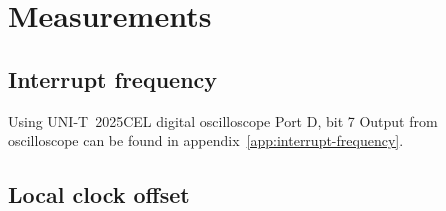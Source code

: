 
\chapter{Measurements}

\section{Interrupt frequency}
Using UNI-T~2025CEL digital oscilloscope
Port D, bit 7
Output from oscilloscope
can be found in appendix~\ref{app:interrupt-frequency}.

\section{Local clock offset}
